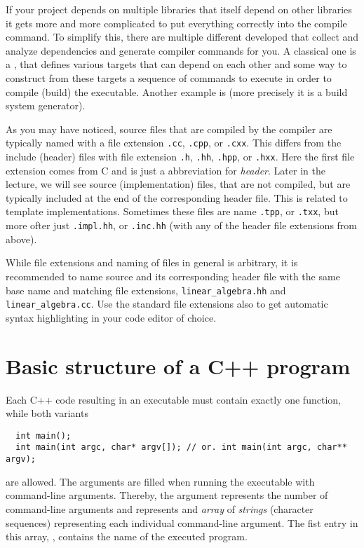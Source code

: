 If your project depends on multiple libraries that itself depend on other libraries it gets more and more complicated to put everything correctly into the compile command. To simplify this, there are multiple different  developed that collect and analyze dependencies and generate compiler commands for you. A classical one is a , that defines various targets that can depend on each other and some way to construct from these targets a sequence of commands to execute in order to compile (build) the executable. Another example is  (more precisely it is a build system generator).

\begin{rem}
  As you may have noticed, source files that are compiled by the compiler are typically named with a file extension \texttt{.cc}, \texttt{.cpp}, or \texttt{.cxx}. This differs from the include (header) files with file extension \texttt{.h}, \texttt{.hh}, \texttt{.hpp}, or \texttt{.hxx}.  Here the first file extension comes from C and is just a abbreviation for \textit{header}. Later in the lecture, we will see source (implementation) files, that are not compiled, but are typically included at the end of the corresponding header file. This is related to template   implementations. Sometimes these files are name \texttt{.tpp}, or \texttt{.txx}, but more ofter just \texttt{.impl.hh}, or \texttt{.inc.hh} (with any of the header file extensions from above).

  While file extensions and naming of files in general is arbitrary, it is recommended to name source and its corresponding header file with the same base name and matching file extensions, \eg \texttt{linear\_algebra.hh} and \texttt{linear\_algebra.cc}. Use the standard file extensions also to get automatic syntax highlighting in your code editor of choice.
\end{rem}


\section{Basic structure of a C++ program\label{sec:code-structure}}
Each C++ code resulting in an executable must contain exactly one  function, while both variants
%
\begin{verbatim}
  int main();
  int main(int argc, char* argv[]); // or. int main(int argc, char** argv);
\end{verbatim}
%
are allowed. The arguments  are filled when running the executable with command-line arguments. Thereby, the argument  represents the number of command-line arguments and  represents and \textit{array} of \textit{strings} (character sequences) representing each individual command-line argument. The fist entry in this array, , contains the name of the executed program.

